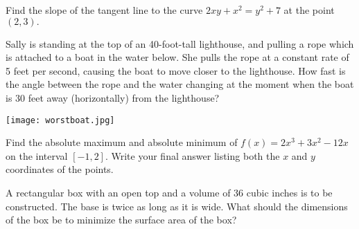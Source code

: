 \documentclass[addpoints,12pt]{exam}
\begin{document}
\begin{questions}








\newpage

\question[10] Find the slope of the tangent line to the curve $2xy + x^2 = y^2 +7 $ at the point
$(2,3).$

\newpage


\question[12] Sally is standing at the top of an 40-foot-tall lighthouse, and pulling a rope which is
attached to a boat in the water below. She pulls the rope at a constant rate of 5 feet per
second, causing the boat to move closer to the lighthouse. How fast is the angle between the
rope and the water changing at the moment when the boat is 30 feet away (horizontally) from
the lighthouse?


\hfill \texttt{[image: worstboat.jpg]}

\newpage


\question[8] Find the absolute maximum and absolute minimum of $f(x) = 2x^3+3x^2-12x$ on
the interval $[-1, 2]$. Write your final answer listing both the $x$ and $y$ coordinates of the
points.

\newpage

\question[12] A rectangular box with an open top and a volume of 36 cubic inches is to be
constructed. %
The base is twice as long as it is wide. What should the dimensions of the box be to minimize
the surface area of the box?


\end{questions}
\end{document}
